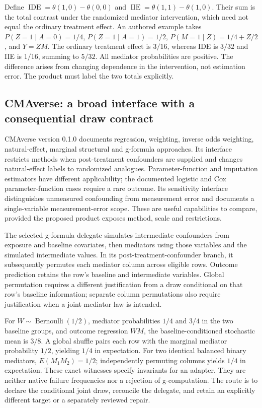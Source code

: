 Define $\operatorname{IDE}=\theta(1,0)-\theta(0,0)$ and
$\operatorname{IIE}=\theta(1,1)-\theta(1,0)$. Their sum is the total contrast
under the randomized mediator intervention, which need not equal the ordinary
treatment effect. An authored example takes
$P(Z=1\mid A=0)=1/4$, $P(Z=1\mid A=1)=1/2$,
$P(M=1\mid Z)=1/4+Z/2$, and $Y=ZM$. The ordinary treatment effect is $3/16$,
whereas IDE is $3/32$ and IIE is $1/16$, summing to $5/32$. All mediator
probabilities are positive. The difference arises from changing dependence in
the intervention, not estimation error. The product must label the two totals
explicitly. \citep{exec25_rmed_choice}

\subsection{CMAverse: a broad interface with a consequential draw contract}

CMAverse version 0.1.0 documents regression, weighting, inverse odds weighting,
natural-effect, marginal structural and g-formula approaches. Its interface
restricts methods when post-treatment confounders are supplied and changes
natural-effect labels to randomized analogues. Parameter-function and imputation
estimators have different applicability; the documented logistic and Cox
parameter-function cases require a rare outcome. Its sensitivity interface
distinguishes unmeasured confounding from measurement error and documents a
single-variable measurement-error scope. These are useful capabilities to
compare, provided the proposed product exposes method, scale and restrictions.
\citep{exec25_rmed_cmaverse}

The selected g-formula delegate simulates intermediate confounders from
exposure and baseline covariates, then mediators using those variables and the
simulated intermediate values. In its post-treatment-confounder branch, it
subsequently permutes each mediator column across eligible rows. Outcome
prediction retains the row's baseline and intermediate variables. Global
permutation requires a different justification from a draw conditional on that
row's baseline information; separate column permutations also require
justification when a joint mediator law is intended. \citep{exec25_rmed_cmaverse}

For $W\sim\operatorname{Bernoulli}(1/2)$, mediator probabilities $1/4$ and
$3/4$ in the two baseline groups, and outcome regression $WM$, the
baseline-conditioned stochastic mean is $3/8$. A global shuffle pairs each
row with the marginal mediator probability $1/2$, yielding $1/4$ in expectation.
For two identical balanced binary mediators, $E(M_1M_2)=1/2$; independently
permuting columns yields $1/4$ in expectation. These exact witnesses specify
invariants for an adapter. They are neither native failure frequencies nor a
rejection of g-computation. The route is to declare the conditional joint draw,
reconcile the delegate, and retain an explicitly different target or a separately
reviewed repair. \citep{exec25_rmed_choice}

